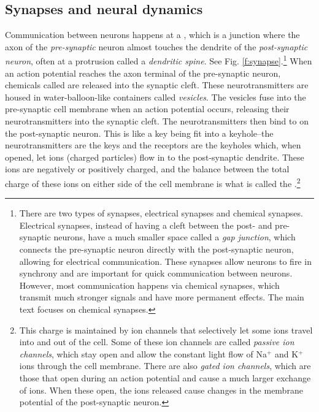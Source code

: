 \subsection{Synapses and neural dynamics}\label{simpleNeuralDynamics}

Communication between neurons happens at a , which is a junction where the axon of the \emph{pre-synaptic} neuron almost touches the dendrite of the \emph{post-synaptic neuron}, often at a protrusion called a \emph{dendritic spine}. See Fig. \ref{f:synapse}.\footnote{There are two types of synapses, electrical synapses and chemical synapses. Electrical synapses, instead of having a cleft between the post- and pre-synaptic neurons, have a much smaller space called a \emph{gap junction}, which connects the pre-synaptic neuron directly with the post-synaptic neuron, allowing for electrical communication. These synapses allow neurons to fire in synchrony and are important for quick communication between neurons. However, most communication happens via chemical synapses, which transmit much stronger signals and have more permanent effects. The main text focuses on chemical synapses.}  When an action potential reaches the axon terminal of the pre-synaptic neuron, chemicals called  are released into the synaptic cleft. These neurotransmitters are housed in water-balloon-like containers called \emph{vesicles}. The vesicles fuse into the pre-synaptic cell membrane when an action potential occurs, releasing their neurotransmitters into the synaptic cleft. The neurotransmitters then bind to  on the post-synaptic neuron. This is like a key being fit into a keyhole--the neurotransmitters are the keys and the receptors are the keyholes which, when opened, let ions (charged particles) flow in to the post-synaptic dendrite. These ions are negatively or positively charged, and the balance between the total charge of these ions on either side of the cell membrane is what is called the .\footnote{This charge is maintained by ion channels that selectively let some ions travel into and out of the cell. Some of these ion channels are called \emph{passive ion channels}, which stay open and allow the constant light flow of Na$^+$ and K$^+$ ions through the cell membrane. There are also \emph{gated ion channels}, which are those that open during an action potential and cause a much larger exchange of ions. When these open, the ions released cause changes in the membrane potential of the post-synaptic neuron.}

